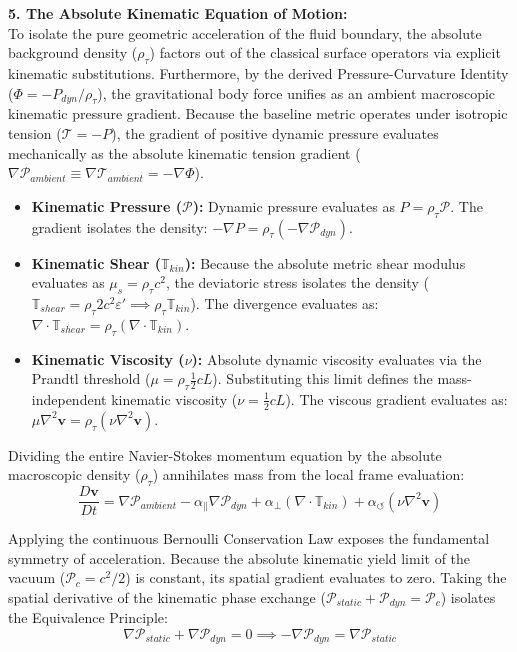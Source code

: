 \documentclass[11pt, a4paper]{article}
\begin{document}
\textbf{5. The Absolute Kinematic Equation of Motion:} \\
To isolate the pure geometric acceleration of the fluid boundary, the absolute background density ($\rho_{\tau}$) factors out of the classical surface operators via explicit kinematic substitutions. Furthermore, by the derived Pressure-Curvature Identity ($\Phi = -P_{dyn}/\rho_{\tau}$), the gravitational body force unifies as an ambient macroscopic kinematic pressure gradient. Because the baseline metric operates under isotropic tension ($\mathcal{T} = -P$), the gradient of positive dynamic pressure evaluates mechanically as the absolute kinematic tension gradient ($\nabla \mathcal{P}_{ambient} \equiv \nabla \mathcal{T}_{ambient} = -\nabla \Phi$).

\begin{itemize}[leftmargin=*]
    \item \textbf{Kinematic Pressure ($\mathcal{P}$):} Dynamic pressure evaluates as $P = \rho_{\tau} \mathcal{P}$. The gradient isolates the density: $-\nabla P = \rho_{\tau}(-\nabla \mathcal{P}_{dyn})$.
    \item \textbf{Kinematic Shear ($\mathbb{T}_{kin}$):} Because the absolute metric shear modulus evaluates as $\mu_s = \rho_{\tau} c^2$, the deviatoric stress isolates the density ($\mathbb{T}_{shear} = \rho_{\tau} 2c^2 \varepsilon' \implies \rho_{\tau} \mathbb{T}_{kin}$). The divergence evaluates as: $\nabla \cdot \mathbb{T}_{shear} = \rho_{\tau}(\nabla \cdot \mathbb{T}_{kin})$.
    \item \textbf{Kinematic Viscosity ($\nu$):} Absolute dynamic viscosity evaluates via the Prandtl threshold ($\mu = \rho_{\tau} \frac{1}{2}cL$). Substituting this limit defines the mass-independent kinematic viscosity ($\nu = \frac{1}{2}cL$). The viscous gradient evaluates as: $\mu \nabla^2 \mathbf{v} = \rho_{\tau}(\nu \nabla^2 \mathbf{v})$.
\end{itemize}

Dividing the entire Navier-Stokes momentum equation by the absolute macroscopic density ($\rho_{\tau}$) annihilates mass from the local frame evaluation:
\begin{equation}
    \frac{D\mathbf{v}}{Dt} = \nabla \mathcal{P}_{ambient} - \alpha_{\parallel}\nabla \mathcal{P}_{dyn} + \alpha_{\perp}(\nabla \cdot \mathbb{T}_{kin}) + \alpha_{\circlearrowleft}(\nu \nabla^2 \mathbf{v}) \nonumber
\end{equation}

Applying the continuous Bernoulli Conservation Law exposes the fundamental symmetry of acceleration. Because the absolute kinematic yield limit of the vacuum ($\mathcal{P}_c = c^2/2$) is constant, its spatial gradient evaluates to zero. Taking the spatial derivative of the kinematic phase exchange ($\mathcal{P}_{static} + \mathcal{P}_{dyn} = \mathcal{P}_c$) isolates the Equivalence Principle:
\begin{equation}
    \nabla \mathcal{P}_{static} + \nabla \mathcal{P}_{dyn} = 0 \implies -\nabla \mathcal{P}_{dyn} = \nabla \mathcal{P}_{static}
\end{equation}
\end{document}
